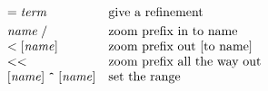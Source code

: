 \documentclass{article}
\begin{document}
\[\begin{array}{ll}
{\tt =}\;\mathit{term} & \mbox{give a refinement} \smallskip\\

\mathit{name}\;{\tt /} & \mbox{zoom prefix in to name}\\
{\tt <}\;[\mathit{name}] & \mbox{zoom prefix out [to name]}\\
{\tt <<} & \mbox{zoom prefix all the way out}\\
{}[\mathit{name}]\;\mbox{\tt \^{}}\;[\mathit{name}] & \mbox{set the range}\\
\end{array}\]
\end{document}
